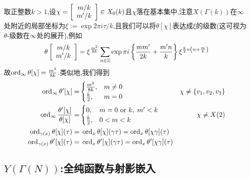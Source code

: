 取正整数$k>1$,设$\chi=\left[\begin{array}{c}{m/k} \\ {m'/k}\end{array}\right] \in X_0(k)$且$\chi$落在基本集中,注意$X(\Gamma(k))$在$\infty$处附近的局部坐标为$\xi:=\exp 2\pi i \tau/k$,且我们可以将$\theta[\chi]$表达成$\xi$的级数(这可视为$\theta$-级数在$\infty$处的展开),例如
$$\theta\left[\begin{array}{c}{m/k} \\ {m'/k}\end{array}\right]=\xi^{\frac{m^2}{8k}} \sum_{n \in \mathbb{Z}} \exp \pi i \left\{ \frac{mm'}{2k}+\frac{m'n}{k} \right\} \xi ^{\frac{k}{2} n\left(n+\frac{m}{k} \right)}$$
故$\operatorname{ord}_{\infty} \theta[\chi]= \frac{m^2}{8k}$.类似地,我们得到
\begin{equation*}
\begin{aligned}
\operatorname{ord}_{\infty} \theta'[\chi]=& \begin{cases}
\frac{m^2}{8k}, & m \neq 0\\
\frac{k}{2}, & m=0
\end{cases} & \chi \neq \{v_1,v_2,v_3\} \\
\operatorname{ord}_{\infty} \frac{\theta'[\chi]}{\theta[\chi]}=& \begin{cases}
0, & m = 0 \text{ or }k,\; m'<k \\
\frac{k}{2}, & 0<m<k
\end{cases} & \chi \neq X(2) \\
\operatorname{ord}_{\gamma(x)} \theta[\chi](\tau)=&\;\operatorname{ord}_{x} \theta[\chi](\gamma\tau)=\operatorname{ord}_{x} \theta[\chi\gamma](\tau)\\
\operatorname{ord}_{\gamma(x)} \theta'[\chi](\tau)=&\;\operatorname{ord}_{x} \theta'[\chi](\gamma\tau)=\operatorname{ord}_{x} \theta'[\chi\gamma](\tau)\\
\end{aligned}
\end{equation*}


\subsection{$Y(\Gamma(N))$:全纯函数与射影嵌入}


